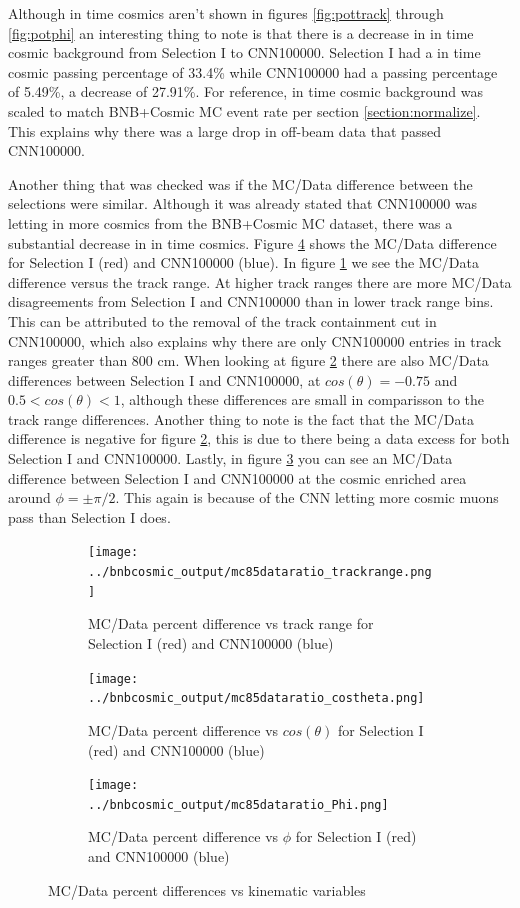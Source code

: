 Although in time cosmics aren't shown in figures \ref{fig:pottrack} through \ref{fig:potphi} an interesting thing to note is that there is a decrease in in time cosmic background from Selection I to CNN100000. Selection I had a in time cosmic passing percentage of 33.4\% while CNN100000 had a passing percentage of 5.49\%, a decrease of 27.91\%. For reference, in time cosmic background was scaled to match BNB+Cosmic MC event rate per section \ref{section:normalize}. This explains why there was a large drop in off-beam data that passed CNN100000. 


Another thing that was checked was if the MC/Data difference between the selections were similar. Although it was already stated that CNN100000 was letting in more cosmics from the BNB+Cosmic MC dataset, there was a substantial decrease in in time cosmics. Figure \ref{fig:diff} shows the MC/Data difference for Selection I (red) and CNN100000 (blue). In figure \ref{fig:difftrack} we see the MC/Data difference versus the track range. At higher track ranges there are more MC/Data disagreements from Selection I and CNN100000 than in lower track range bins. This can be attributed to the removal of the track containment cut in CNN100000, which also explains why there are only CNN100000 entries in track ranges greater than 800 cm. When looking at figure \ref{fig:diffcostheta} there are also MC/Data differences between Selection I and CNN100000, at $cos(\theta) = -0.75$ and $ 0.5<cos(\theta)<1$, although these differences are small in comparisson to the track range differences. Another thing to note is the fact that the MC/Data difference is negative for figure \ref{fig:diffcostheta}, this is due to there being a data excess for both Selection I and CNN100000. Lastly, in figure \ref{fig:diffphi} you can see an MC/Data difference between Selection I and CNN100000 at the cosmic enriched area around $\phi=\pm\pi/2$. This again is because of the CNN letting more cosmic muons pass than Selection I does. 
\begin{figure}[htp!]
\centering
	\begin{subfigure}[t]{.475\textwidth}
		\texttt{[image: ../bnbcosmic\_output/mc85dataratio\_trackrange.png]}
		\caption{MC/Data percent difference vs track range for Selection I (red) and CNN100000 (blue)} 
		\label{fig:difftrack}
	\end{subfigure}
	\begin{subfigure}[t]{.475\textwidth}
	\centering
		\texttt{[image: ../bnbcosmic\_output/mc85dataratio\_costheta.png]}
		\caption{MC/Data percent difference vs $cos(\theta)$ for Selection I (red) and CNN100000 (blue)} 
		\label{fig:diffcostheta}
	\end{subfigure}
	\begin{subfigure}[t]{.475\textwidth}
	\centering
		\texttt{[image: ../bnbcosmic\_output/mc85dataratio\_Phi.png]}
		\caption{MC/Data percent difference vs $\phi$ for Selection I (red) and CNN100000 (blue)} 
		\label{fig:diffphi}
	\end{subfigure}
\caption{MC/Data percent differences vs kinematic variables}
\label{fig:diff}
\end{figure}

